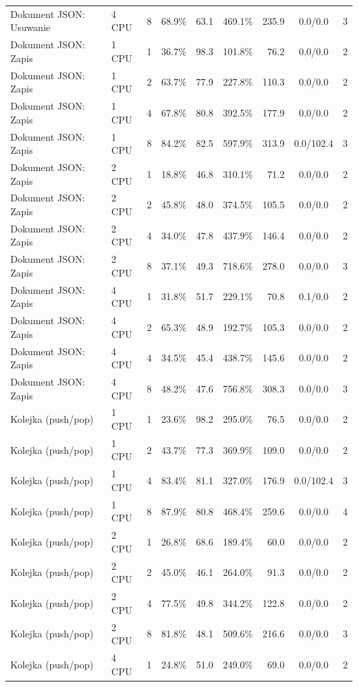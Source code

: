 \begin{table}[ht]
{\begin{tabular}{llcrrrrcc}
Dokument JSON: Usuwanie & 4 CPU & 8 & 68.9\% & 63.1 & 469.1\% & 235.9 & 0.0/0.0 & 3 \\
Dokument JSON: Zapis & 1 CPU & 1 & 36.7\% & 98.3 & 101.8\% & 76.2 & 0.0/0.0 & 2 \\
Dokument JSON: Zapis & 1 CPU & 2 & 63.7\% & 77.9 & 227.8\% & 110.3 & 0.0/0.0 & 2 \\
Dokument JSON: Zapis & 1 CPU & 4 & 67.8\% & 80.8 & 392.5\% & 177.9 & 0.0/0.0 & 2 \\
Dokument JSON: Zapis & 1 CPU & 8 & 84.2\% & 82.5 & 597.9\% & 313.9 & 0.0/102.4 & 3 \\
Dokument JSON: Zapis & 2 CPU & 1 & 18.8\% & 46.8 & 310.1\% & 71.2 & 0.0/0.0 & 2 \\
Dokument JSON: Zapis & 2 CPU & 2 & 45.8\% & 48.0 & 374.5\% & 105.5 & 0.0/0.0 & 2 \\
Dokument JSON: Zapis & 2 CPU & 4 & 34.0\% & 47.8 & 437.9\% & 146.4 & 0.0/0.0 & 2 \\
Dokument JSON: Zapis & 2 CPU & 8 & 37.1\% & 49.3 & 718.6\% & 278.0 & 0.0/0.0 & 3 \\
Dokument JSON: Zapis & 4 CPU & 1 & 31.8\% & 51.7 & 229.1\% & 70.8 & 0.1/0.0 & 2 \\
Dokument JSON: Zapis & 4 CPU & 2 & 65.3\% & 48.9 & 192.7\% & 105.3 & 0.0/0.0 & 2 \\
Dokument JSON: Zapis & 4 CPU & 4 & 34.5\% & 45.4 & 438.7\% & 145.6 & 0.0/0.0 & 2 \\
Dokument JSON: Zapis & 4 CPU & 8 & 48.2\% & 47.6 & 756.8\% & 308.3 & 0.0/0.0 & 3 \\
Kolejka (push/pop) & 1 CPU & 1 & 23.6\% & 98.2 & 295.0\% & 76.5 & 0.0/0.0 & 2 \\
Kolejka (push/pop) & 1 CPU & 2 & 43.7\% & 77.3 & 369.9\% & 109.0 & 0.0/0.0 & 2 \\
Kolejka (push/pop) & 1 CPU & 4 & 83.4\% & 81.1 & 327.0\% & 176.9 & 0.0/102.4 & 3 \\
Kolejka (push/pop) & 1 CPU & 8 & 87.9\% & 80.8 & 468.4\% & 259.6 & 0.0/0.0 & 4 \\
Kolejka (push/pop) & 2 CPU & 1 & 26.8\% & 68.6 & 189.4\% & 60.0 & 0.0/0.0 & 2 \\
Kolejka (push/pop) & 2 CPU & 2 & 45.0\% & 46.1 & 264.0\% & 91.3 & 0.0/0.0 & 2 \\
Kolejka (push/pop) & 2 CPU & 4 & 77.5\% & 49.8 & 344.2\% & 122.8 & 0.0/0.0 & 2 \\
Kolejka (push/pop) & 2 CPU & 8 & 81.8\% & 48.1 & 509.6\% & 216.6 & 0.0/0.0 & 3 \\
Kolejka (push/pop) & 4 CPU & 1 & 24.8\% & 51.0 & 249.0\% & 69.0 & 0.0/0.0 & 2 \\

\end{tabular}}
\end{table}

